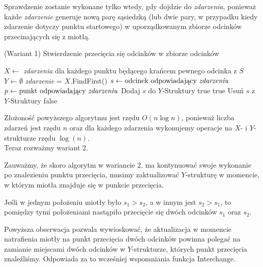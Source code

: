 Sprawdzenie zostanie wykonane tylko wtedy, gdy dojdzie do \textit{zdarzenia},
ponieważ każde \textit{zdarzenie} generuje nową parę sąsiedzką 
(lub dwie pary, w przypadku kiedy zdarzenie dotyczy punktu startowego) 
w uporządkowanym zbiorze odcinków przecinających się z miotłą.

\begin{algorithm}[H]
	\caption{(Wariant 1) Stwierdzenie przecięcia się odcinków w zbiorze odcinków}
	\begin{algorithmic}[1]
		\State $X \gets$ \textit{zdarzenia} dla każdego punktu będącego
		krańcem pewnego odcinka z $S$
		\State $Y \gets \emptyset$
		\State \textit{zdarzenie} = $X.$FindFirst()
		\State $s \gets \text{odcinek odpowiadający \textit{zdarzeniu}}$
		\State $p \gets \text{punkt odpowiadający \textit{zdarzeniu}}$
		\State Dodaj $s$ do $Y$-Struktury
		\State \Return true
		\EndIf
		\Else
		\State \Return true
		\EndIf
		\State Usuń $s$ z $Y$-Struktury
		\EndIf
		\EndWhile
		\State \Return false
		\EndProcedure
	\end{algorithmic}
	\label{HasIntersectingSegments1}
\end{algorithm}

Złożoność powyższego algorytmu jest rzędu $O(n\log n)$, ponieważ liczba zdarzeń jest
rzędu $n$ oraz dla każdego zdarzenia wykonujemy operacje na $X$- i $Y$-strukturze rzędu $\log(n)$.
\\

Teraz rozważmy {wariant 2}.

Zauważmy, że skoro algorytm w {wariancie 2.} ma kontynuować swoje wykonanie po znalezieniu punktu
przecięcia, musimy zaktualizować $Y$-strukturę w momencie, w którym
miotła znajduje się w punkcie przecięcia. 

\begin{obs}
	Jeśli w jednym położeniu miotły było $s_1 > s_2$, a w innym 
	jest $s_2 > s_1$, to pomiędzy tymi położeniami nastąpiło przecięcie się
	dwóch odcinków $s_1$ oraz $s_2$.
\end{obs}

Powyższa obserwacja pozwala wywioskować, że aktualizacja w momencie 
natrafienia miotły na punkt przecięcia dwóch odcinków powinna polegać
na zamianie miejscami dwóch odcinków w $Y$-strukturze, których punkt przecięcia znaleźliśmy. 
Odpowiada za to wcześniej wspomniania funkcja Interchange.

